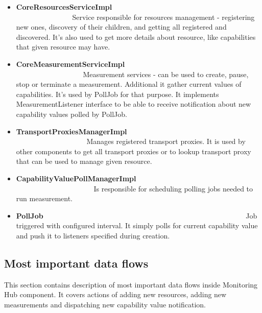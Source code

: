 \begin{itemize}
 \item {\bf CoreResourcesServiceImpl}~~~~~~~~~~~~~~~~~~~~~~~~~~~~~~~~~~~~~~~~~~~~~~~~~~~~~~~~\linebreak
Service responsible for resources management - registering new ones, discovery of their children, and getting all
registered and discovered. It's also used to get more details about resource, like capabilities that given resource may
have.


 \item {\bf CoreMeasurementServiceImpl}~~~~~~~~~~~~~~~~~~~~~~~~~~~~~~~~~~~~~~~~~~~~~~~~~~~~~~~~\linebreak
Measurement services - can be used to create, pause, stop or terminate a measurement. Additional it gather current
values of capabilities. It's used by PollJob for that purpose. It implements MeasurementListener interface to be able
to receive notification about new capability values polled by PollJob. 

 \item {\bf TransportProxiesManagerImpl}~~~~~~~~~~~~~~~~~~~~~~~~~~~~~~~~~~~~~~~~~~~~~~~~~~~~~~~~\linebreak
Manages registered transport proxies. It is used by other components to get all transport proxies or to lookup transport
proxy that can be used to manage given resource.

 \item {\bf CapabilityValuePollManagerImpl}~~~~~~~~~~~~~~~~~~~~~~~~~~~~~~~~~~~~~~~~~~~~~~~~~~~~~~~~\linebreak
Is responsible for scheduling polling jobs needed to run measurement.

 \item {\bf PollJob}~~~~~~~~~~~~~~~~~~~~~~~~~~~~~~~~~~~~~~~~~~~~~~~~~~~~~~~~\linebreak
Job triggered with configured interval. It simply polls for current capability value and push it to listeners specified
during creation.

\end{itemize}

\pagebreak

\subsection{Most important data flows}

This section contains description of most important data flows inside Monitoring Hub component. It covers actions
of adding new resources, adding new measurements and dispatching new capability value notification.


